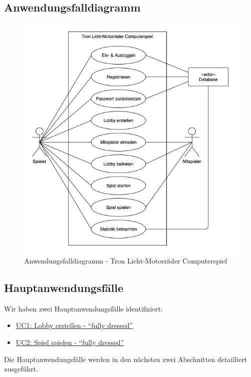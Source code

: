 \documentclass[11pt,ngerman]{article}
\newcommand{\quotes}[1]{``#1''}
\begin{document}
        \subsection{Anwendungsfalldiagramm}
            \begin{figure}[H]
                \includegraphics[scale=0.77]{figures/Use-case-modell.png}
                \caption{Anwendungsfalldiagramm - Tron Licht-Motorräder Computerspiel}
            \end{figure}

        \subsection{Hauptanwendungsfälle}
            Wir haben zwei Hauptanwendungsfälle identifiziert:
             \begin{itemize}
                \item  \hyperref[ssec:UC1Lobbyerstellen]{UC1: Lobby erstellen - \quotes{fully dressed}}
                \item\hyperref[ssec:UC2Spielspielen]{UC2: Spiel spielen - \quotes{fully dressed}}
            \end{itemize}
            Die Hauptanwendungsfälle werden in den nächsten zwei Abschnitten detailliert ausgeführt.
\end{document}
